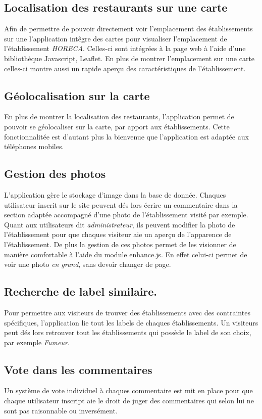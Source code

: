 \documentclass[a4paper,10pt]{article}
\begin{document}
\subsection{Localisation des restaurants sur une carte}
    Afin de permettre de pouvoir directement voir l'emplacement des
    établissements sur une l'application intêgre des cartes pour visualiser
    l'emplacement de l'établissement \emph{HORECA}. Celles-ci sont intégrées à
    la page web à l'aide d'une bibliothèque Javascript, Leaflet.
    En plus de montrer l'emplacement sur une carte celles-ci montre aussi un
    rapide aperçu des caractéristiques de l'établissement.


\subsection{Géolocalisation sur la carte}
    En plus de montrer la localisation des restaurants, l'application permet
    de pouvoir se géolocaliser sur la carte, par apport aux établissements.
    \newline
    Cette fonctionnalitée est d'autant plus la bienvenue que l'application est
    adaptée aux téléphones mobiles.

\subsection{Gestion des photos}
    L'application gère le stockage d'image dans la base de donnée.
    Chaques utilisateur inscrit sur le site peuvent dés lors écrire un
    commentaire dans la section adaptée accompagné d'une photo de
    l'établissement visité par exemple. \newline
    Quant aux utilisateurs dit \emph{administrateur}, ils peuvent modifier
    la photo de l'établissement pour que chaques visiteur aie un aperçu de
    l'apparence de l'établissement. \newline
    De plus la gestion de ces photos permet de les visionner de manière
    comfortable à l'aide du module enhance.js. En effet celui-ci permet de voir
    une photo \emph{en grand}, sans devoir changer de page.


\subsection{Recherche de label similaire.}
    Pour permettre aux visiteurs de trouver des établissements avec des
    contraintes spécifiques, l'application lie tout les labels de chaques
    établissements. Un visiteurs peut dés lors retrouver tout les
    établissements qui possède le label de son choix, par exemple
    \emph{Fumeur}.

\subsection{Vote dans les commentaires}
    Un système de vote individuel à chaques commentaire est mit en place pour
    que chaque utilisateur inscript aie le droit de juger des commentaires
    qui selon lui ne sont pas raisonnable ou inversément.
\end{document}
